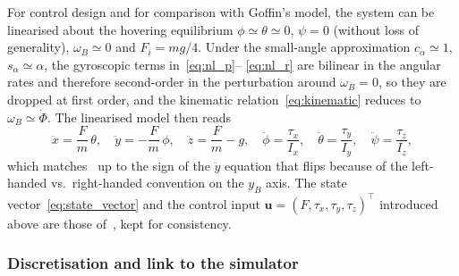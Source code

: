\documentclass[11pt,a4paper]{article}
\theoremstyle{remark}
\numberwithin{equation}{section}
\begin{document}
For control design and for comparison with Goffin's model, the system can be linearised about
the hovering equilibrium $\phi \simeq \theta \simeq 0$, $\psi = 0$ (without loss of
generality), $\omega_B \simeq 0$ and $F_i = m g / 4$. Under the small-angle approximation
$c_\alpha \simeq 1$, $s_\alpha \simeq \alpha$, the gyroscopic terms in~\eqref{eq:nl_p}--%
\eqref{eq:nl_r} are bilinear in the angular rates and therefore second-order in the
perturbation around $\omega_B = 0$, so they are dropped at first order, and the kinematic
relation~\eqref{eq:kinematic} reduces to $\omega_B \simeq \dot{\Phi}$. The linearised model
then reads
\begin{equation}
\ddot{x} = \frac{F}{m}\, \theta, \quad
\ddot{y} = -\frac{F}{m}\, \phi, \quad
\ddot{z} = \frac{F}{m} - g, \quad
\ddot{\phi} = \frac{\tau_x}{I_x}, \quad
\ddot{\theta} = \frac{\tau_y}{I_y}, \quad
\ddot{\psi} = \frac{\tau_z}{I_z},
\label{eq:linearized}
\end{equation}
which matches~\cite[Eqs.~(2.13)--(2.18)]{goffin2026} up to the sign of the $\ddot y$ equation
that flips because of the left-handed vs.\ right-handed convention on the $y_B$ axis. The
state vector~\eqref{eq:state_vector} and the control input
$\mathbf{u} = (F, \tau_x, \tau_y, \tau_z)^\top$ introduced above are those
of~\cite{goffin2026}, kept for consistency.

\subsubsection*{Discretisation and link to the simulator}
\end{document}
